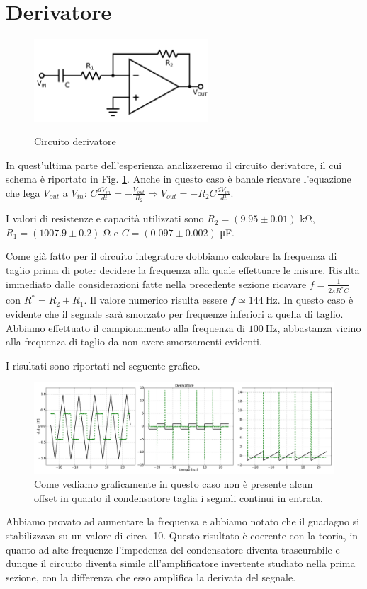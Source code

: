 \section{Derivatore}

\begin{figure}
	\caption{Circuito derivatore}
	\includegraphics[width=65mm]{ccder.pdf}
	\label{fig:ccder}
\end{figure}

In quest'ultima parte dell'esperienza analizzeremo il circuito derivatore, il cui schema è riportato in Fig. \ref{fig:ccder}.
Anche in questo caso è banale ricavare l'equazione che lega $V_{out}$ a $V_{in}$: $C\frac{dV_{in}}{dt}=-\frac{V_{out}}{R_2}\Rightarrow V_{out}=-R_2C\frac{dV_{in}}{dt}$.

I valori di resistenze e capacità utilizzati sono $R_2=(9.95 \pm 0.01)$ \si{\kilo\ohm}, $R_1=(1007.9 \pm 0.2)$ \si{\ohm} e $C=(0.097 \pm 0.002)$ \si{\micro\farad}.

Come già fatto per il circuito integratore dobbiamo calcolare la frequenza di taglio prima di poter decidere la frequenza alla quale effettuare le misure.
Risulta immediato dalle considerazioni fatte nella precedente sezione ricavare $f=\frac{1}{2 \pi R^* C}$ con $R^*=R_2+R_1$.
Il valore numerico risulta essere $f \simeq \SI{144}{\hertz}$.
In questo caso è evidente che il segnale sarà smorzato per frequenze inferiori a quella di taglio. Abbiamo effettuato il campionamento alla frequenza di $\SI{100}{\hertz}$, abbastanza vicino alla frequenza di taglio da non avere smorzamenti evidenti.

I risultati sono riportati nel seguente grafico.

\begin{figure}[h]
	\centering
			\includegraphics[width=\textwidth]{der_serie_10.pdf}
			\caption{Come vediamo graficamente in questo caso non è presente alcun offset in quanto il condensatore taglia i segnali continui in entrata. }
			\label{fig:der}
\end{figure}

Abbiamo provato ad aumentare la frequenza e abbiamo notato che il guadagno si stabilizzava su un valore di circa -10.
Questo risultato è coerente con la teoria, in quanto ad alte frequenze l'impedenza del condensatore diventa trascurabile e dunque il circuito diventa simile all'amplificatore invertente studiato nella prima sezione, con la differenza che esso amplifica la derivata del segnale.